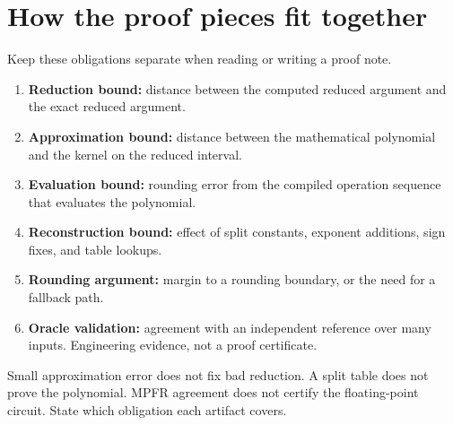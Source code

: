 \documentclass[manuscript, nonacm]{acmart}
\begin{document}


  \section{How the proof pieces fit together}

  Keep these obligations separate when reading or writing a proof note.

  \begin{enumerate}
    \item \textbf{Reduction bound:} distance between the computed reduced
    argument and the exact reduced argument.
    \item \textbf{Approximation bound:} distance between the mathematical
    polynomial and the kernel on the reduced interval.
    \item \textbf{Evaluation bound:} rounding error from the compiled operation
    sequence that evaluates the polynomial.
    \item \textbf{Reconstruction bound:} effect of split constants, exponent
    additions, sign fixes, and table lookups.
    \item \textbf{Rounding argument:} margin to a rounding boundary, or the need
    for a fallback path.
    \item \textbf{Oracle validation:} agreement with an independent reference
    over many inputs. Engineering evidence, not a proof certificate.
  \end{enumerate}

  Small approximation error does not fix bad reduction. A split table does
  not prove the polynomial. MPFR agreement does not certify the floating-point
  circuit. State which obligation each artifact covers.
\end{document}
